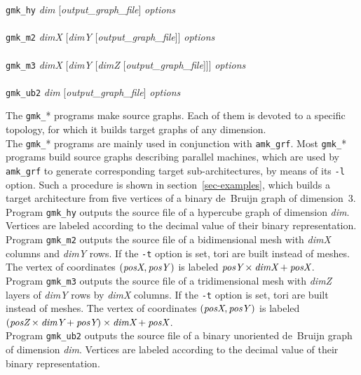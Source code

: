 \begin{itemize}
\progsyn
\texttt{gmk\_hy} {\it dim} [{\it output\_graph\_file}] {\it options}\\
~\\
\texttt{gmk\_m2} {\it dimX} [{\it dimY} [{\it output\_graph\_file}]] {\it options}\\
~\\
\texttt{gmk\_m3} {\it dimX} [{\it dimY} [{\it dimZ} [{\it output\_graph\_file}]]] {\it options}\\
~\\
\texttt{gmk\_ub2} {\it dim} [{\it output\_graph\_file}] {\it options}

\progdes
The \texttt{gmk\_}* programs make source graphs.
Each of them is devoted to a specific topology, for which it builds target
graphs of any dimension.
\\
The \texttt{gmk\_}* programs are mainly used in conjunction with \texttt{amk\_grf}.
Most \texttt{gmk\_}* programs build source graphs
describing parallel machines, which are used by \texttt{amk\_grf} to generate
corresponding target sub-architectures, by means of its \texttt{-l}
option.
Such a procedure is shown in section~\ref{sec-examples}, which builds a target
architecture from five vertices of a binary de~Bruijn graph of dimension~$3$.
\\

\noi
Program \texttt{gmk\_hy} outputs the source file of a hypercube graph of
dimension {\it dim}. Vertices are labeled according to the decimal value
of their binary representation.
\\

\noi
Program \texttt{gmk\_m2} outputs the source file of a bidimensional mesh
with {\it dimX\/} columns and {\it dimY\/} rows. If the \texttt{-t}
option is set, tori are built instead of meshes. The vertex of
coordinates $(\mbox{\it posX},\mbox{\it posY\/})$ is labeled
$\mbox{\it posY} \times \mbox{\it dimX} + \mbox{\it posX}$.
\\

\noi
Program \texttt{gmk\_m3} outputs the source file of a tridimensional mesh
with {\it dimZ} layers of {\it dimY\/} rows by {\it dimX\/}
columns. If the \texttt{-t} option is set, tori are built instead of
meshes. The vertex of coordinates $(\mbox{\it posX},\mbox{\it
posY\/})$ is labeled $(\mbox{\it posZ} \times \mbox{\it dimY} +
\mbox{\it posY}) \times \mbox{\it dimX} + \mbox{\it posX}$.
\\

\noi
Program \texttt{gmk\_ub2} outputs the source file of a binary unoriented
de~Bruijn graph of dimension {\it dim}. Vertices are labeled according to
the decimal value of their binary representation.


\end{itemize}
